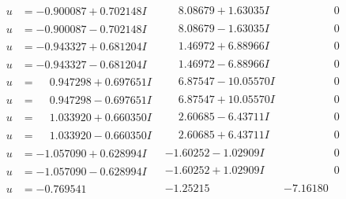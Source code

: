 \documentclass[1p]{elsarticle_modified}
\theoremstyle{definition}
\begin{document}
$$\begin{array}{c|c|c}
\begin{aligned}
u &= -0.900087 + 0.702148 I\end{aligned}
 & \phantom{-}8.08679 + 1.63035 I & \phantom{-0.000000 } 0 \\ \hline\begin{aligned}
u &= -0.900087 - 0.702148 I\end{aligned}
 & \phantom{-}8.08679 - 1.63035 I & \phantom{-0.000000 } 0 \\ \hline\begin{aligned}
u &= -0.943327 + 0.681204 I\end{aligned}
 & \phantom{-}1.46972 + 6.88966 I & \phantom{-0.000000 } 0 \\ \hline\begin{aligned}
u &= -0.943327 - 0.681204 I\end{aligned}
 & \phantom{-}1.46972 - 6.88966 I & \phantom{-0.000000 } 0 \\ \hline\begin{aligned}
u &= \phantom{-}0.947298 + 0.697651 I\end{aligned}
 & \phantom{-}6.87547 - 10.05570 I & \phantom{-0.000000 } 0 \\ \hline\begin{aligned}
u &= \phantom{-}0.947298 - 0.697651 I\end{aligned}
 & \phantom{-}6.87547 + 10.05570 I & \phantom{-0.000000 } 0 \\ \hline\begin{aligned}
u &= \phantom{-}1.033920 + 0.660350 I\end{aligned}
 & \phantom{-}2.60685 - 6.43711 I & \phantom{-0.000000 } 0 \\ \hline\begin{aligned}
u &= \phantom{-}1.033920 - 0.660350 I\end{aligned}
 & \phantom{-}2.60685 + 6.43711 I & \phantom{-0.000000 } 0 \\ \hline\begin{aligned}
u &= -1.057090 + 0.628994 I\end{aligned}
 & -1.60252 - 1.02909 I & \phantom{-0.000000 } 0 \\ \hline\begin{aligned}
u &= -1.057090 - 0.628994 I\end{aligned}
 & -1.60252 + 1.02909 I & \phantom{-0.000000 } 0 \\ \hline\begin{aligned}
u &= -0.769541\phantom{ +0.000000I}\end{aligned}
 & -1.25215\phantom{ +0.000000I} & -7.16180\phantom{ +0.000000I} \\ \hline\begin{aligned}

\end{aligned}
\end{array}$$
\end{document}
